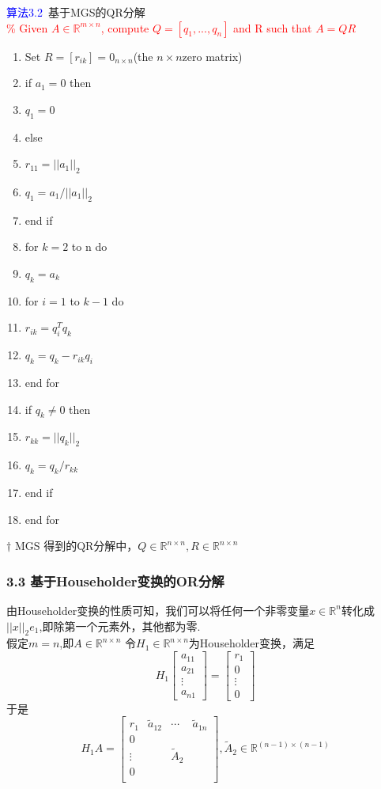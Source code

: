 \documentclass[notheorems,serif]{beamer}
\begin{document}
\newpage
\textcolor{blue}{算法3.2}~基于MGS的QR分解\\
\textcolor{red}{\% Given $A \in \mathbb{R}^{m\times n}$, compute $Q = [q_{1},...,q_{n}]$ and R such that $A = QR$}\\
\begin{enumerate}
	\item Set $R=[r_{ik}]=0_{n\times n}$(the $n\times n$zero matrix)
	\item if $a_{1}=0$ then 
	\item \qquad $q_{1}=0$
	\item else
	\item \qquad $r_{11}=||a_{1}||_{2}$
	\item \qquad $q_{1}=a_{1}/||a_{1}||_{2}$
	\item end if
	\item for $k=2$ to n do
	\item \qquad $q_{k} = a_{k}$
	\item \qquad for $i = 1$ to $k-1$ do
	\item \qquad \qquad $r_{ik}=q_{i}^{T}q_{k}$
	\item \qquad \qquad $q_{k}=q_{k}-r_{ik}q_{i}$
	\item \qquad end for 
	\item \qquad if $q_{k}\ne 0$ then
	\item \qquad \qquad $r_{kk}=||q_{k}||_{2}$
	\item \qquad \qquad $q_{k}=q_{k}/r_{kk}$
	\item \qquad end if
	\item end for  
\end{enumerate}
$\dagger$ MGS 得到的QR分解中，$Q\in\mathbb{R}^{n\times n},R\in\mathbb{R}^{n\times n}$

\begin{frame}
\frametitle{3.3 基于Householder变换的OR分解}
由Householder变换的性质可知，我们可以将任何一个非零变量$x\in\mathbb{R}^{n}$转化成$||x||_{2}e_{1}$,即除第一个元素外，其他都为零.\\
假定$m=n$,即$A\in\mathbb{R}^{n\times n}$ 令$H_{1}\in\mathbb{R}^{n\times n}$为Householder变换，满足
$$
H_{1}\left[\begin{array}{c}{a_{11}} \\ {a_{21}} \\ {\vdots} \\ {a_{n 1}}\end{array}\right]=\left[\begin{array}{c}{r_{1}} \\ {0} \\ {\vdots} \\ {0}\end{array}\right]
$$
于是
$$
H_{1} A=\left[\begin{array}{c|ccc}
{r_{1}}&{\tilde{a}_{12}} &\cdots& {\tilde{a}_{1 n}} \\ \hline 
0& & & \\
\vdots&&{\tilde{A}_{2}}& \\
0& & &\\
\end{array}\right],\tilde{A}_{2} \in \mathbb{R}^{(n-1) \times(n-1)}
$$
\end{frame}
\end{document}
